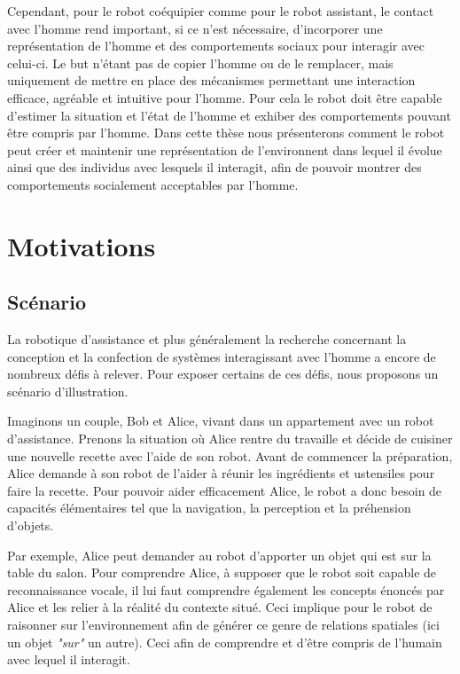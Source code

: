 \documentclass[a4paper,11pt,twoside]{StyleThese}
\begin{document}
Cependant, pour le robot coéquipier comme pour le robot assistant, le contact avec l'homme rend important, si ce n'est nécessaire, d'incorporer une représentation de l'homme et des comportements sociaux pour interagir avec celui-ci. Le but n'étant pas de copier l'homme ou de le remplacer, mais uniquement de mettre en place des mécanismes permettant une interaction efficace, agréable et intuitive pour l'homme. Pour cela le robot doit être capable d'estimer la situation et l'état de l'homme et exhiber des comportements pouvant être compris par l'homme. Dans cette thèse nous présenterons comment le robot peut créer et maintenir une représentation de l'environnent dans lequel il évolue ainsi que des individus avec lesquels il interagit, afin de pouvoir montrer des comportements socialement acceptables par l'homme.



\section{Motivations}


\subsection{Scénario}

La robotique d'assistance et plus généralement la recherche concernant la conception et la confection de systèmes interagissant avec l'homme a encore de nombreux défis à relever. Pour exposer certains de ces défis, nous proposons un scénario d'illustration.

Imaginons un couple, Bob et Alice, vivant dans un appartement avec un robot d'assistance. Prenons la situation où Alice rentre du travaille et décide de cuisiner une nouvelle recette avec l'aide de son robot. Avant de commencer la préparation, Alice demande à son robot de l'aider à réunir les ingrédients et ustensiles pour faire la recette.
Pour pouvoir aider efficacement Alice, le robot a donc besoin de capacités élémentaires tel que la navigation, la perception et la préhension d'objets.

Par exemple, Alice peut demander au robot d'apporter un objet qui est sur la table du salon. Pour comprendre Alice, à supposer que le robot soit capable de reconnaissance vocale, il lui faut comprendre également les concepts énoncés par Alice et les relier à la réalité du contexte situé. Ceci implique pour le robot de raisonner sur l'environnement afin de générer ce genre de relations spatiales (ici un objet \textit{"sur"} un autre). Ceci afin de comprendre et d'être compris de l'humain avec lequel il interagit.
\end{document}
